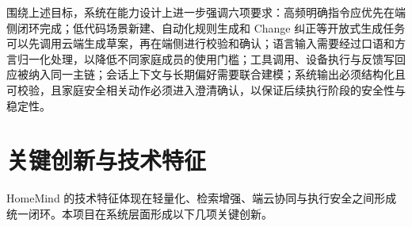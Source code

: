 \documentclass[12pt,a4paper,oneside]{ctexrep}
\begin{document}
围绕上述目标，系统在能力设计上进一步强调六项要求：高频明确指令应优先在端侧闭环完成；低代码场景新建、自动化规则生成和 Change 纠正等开放式生成任务可以先调用云端生成草案，再在端侧进行校验和确认；语言输入需要经过口语和方言归一化处理，以降低不同家庭成员的使用门槛；工具调用、设备执行与反馈写回应被纳入同一主链；会话上下文与长期偏好需要联合建模；系统输出必须结构化且可校验，且家庭安全相关动作必须进入澄清确认，以保证后续执行阶段的安全性与稳定性。

\section{关键创新与技术特征}

HomeMind 的技术特征体现在轻量化、检索增强、端云协同与执行安全之间形成统一闭环。本项目在系统层面形成以下几项关键创新。
\end{document}
